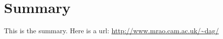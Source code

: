 \chapter*{Summary}


This is the summary.
%
Here is a url: \url{http://www.mrao.cam.ac.uk/~dag/}

\cleardoublepage

\endinput
